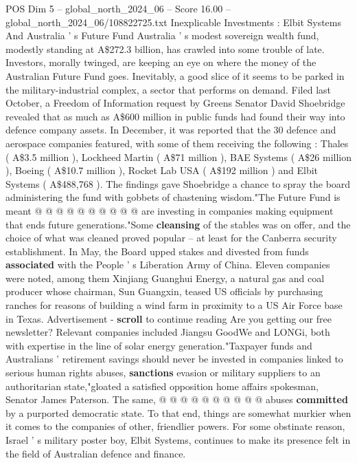 \begin{textsample}{POS Dim 5 – global\_north\_2024\_06 – Score 16.00 – global\_north\_2024\_06/108822725.txt}  \label{ex:f5_pos_316}
Inexplicable Investments : Elbit Systems And Australia ' s Future Fund Australia ' s modest sovereign wealth fund, modestly standing at A\$272.3 billion, has crawled into some trouble of late.
Investors, morally twinged, are keeping an eye on where the money of the Australian Future Fund goes.
Inevitably, a good slice of it seems to be parked in the military-industrial complex, a sector that performs on demand.
Filed last October, a Freedom of Information request by Greens Senator David Shoebridge revealed that as much as A\$600 million in public funds had found their way into defence company assets.
In December, it was reported that the 30 defence and aerospace companies featured, with some of them receiving the following : Thales ( A\$3.5 million ), Lockheed Martin ( A\$71 million ), BAE Systems ( A\$26 million ), Boeing ( A\$10.7 million ), Rocket Lab USA ( A\$192 million ) and Elbit Systems ( A\$488,768 ).
The findings gave Shoebridge a chance to spray the board administering the fund with gobbets of chastening wisdom."The Future Fund is meant @ @ @ @ @ @ @ @ @ @ are investing in companies making equipment that ends future generations."Some \textbf{cleansing} of the stables was on offer, and the choice of what was cleaned proved popular -- at least for the Canberra security establishment.
In May, the Board upped stakes and divested from funds \textbf{associated} with the People ' s Liberation Army of China.
Eleven companies were noted, among them Xinjiang Guanghui Energy, a natural gas and coal producer whose chairman, Sun Guangxin, teased US officials by purchasing ranches for reasons of building a wind farm in proximity to a US Air Force base in Texas.
Advertisement - \textbf{scroll} to continue reading Are you getting our free newsletter?
Relevant companies included Jiangsu GoodWe and LONGi, both with expertise in the line of solar energy generation."Taxpayer funds and Australians ' retirement savings should never be invested in companies linked to serious human rights abuses, \textbf{sanctions} evasion or military suppliers to an authoritarian state,"gloated a satisfied opposition home affairs spokesman, Senator James Paterson.
The same, @ @ @ @ @ @ @ @ @ @ abuses \textbf{committed} by a purported democratic state.
To that end, things are somewhat murkier when it comes to the companies of other, friendlier powers.
For some obstinate reason, Israel ' s military poster boy, Elbit Systems, continues to make its presence felt in the field of Australian defence and finance.

\end{textsample}
